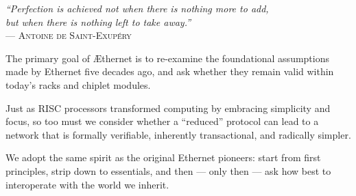 \documentclass[../OAE-SPEC-MAIN.tex]{subfiles}
\begin{document}
\vspace{150mm}


\vspace*{0.25\textheight}

\begin{fullwidth}
\begin{center}
    
    
    \begin{minipage}{0.8\textwidth}
        \centering
        \emph{“Perfection is achieved not when there is nothing more to add,\\
        but when there is nothing left to take away.”}\\
        \vspace{0.5em}
        — \textsc{Antoine de Saint-Exupéry}
    \end{minipage}

\vspace{3em}

\noindent
\begin{minipage}{4.5in} %
\setlength{\parskip}{0.5em}

The primary goal of \AE thernet is to re-examine the foundational assumptions made by Ethernet five decades ago, and ask whether they remain valid within today’s racks and chiplet modules.

\vspace{1.5em}

Just as RISC processors transformed computing by embracing simplicity and focus, so too must we consider whether a ``reduced'' protocol can lead to a network that is formally verifiable, inherently transactional, and radically simpler.

\vspace{1.5em}

We adopt the same spirit as the original Ethernet pioneers: start from first principles, strip down to essentials, and then --- only then --- ask how best to interoperate with the world we inherit.

\end{minipage}
\end{center}
\end{fullwidth}
\end{document}
